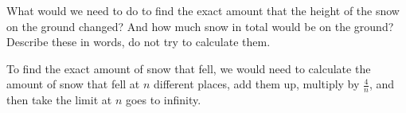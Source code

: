 \documentclass[handout, nooutcomes]{ximera}
\renewenvironment{freeResponse}{
\ifhandout\setbox0\vbox\bgroup\else
\begin{trivlist}\item[\hskip \labelsep\bfseries Solution:\hspace{2ex}]
\fi}
{\ifhandout\egroup\else
\end{trivlist}
\fi}
\begin{document}
\begin{problem}
\begin{enumerate}
    
    

  \item  What would we need to do to find the exact amount that the height of the snow on the ground changed?  And how much snow in total would be on the ground?  Describe these in words, do not try to calculate them.
    \begin{freeResponse}
      To find the exact amount of snow that fell, we would need to calculate the amount of snow that fell at $n$ different places, add them up, multiply by $\frac{4}{n}$, and then take the limit at $n$ goes to infinity.
    \end{freeResponse}
  \end{enumerate}
\end{problem}
\end{document}
